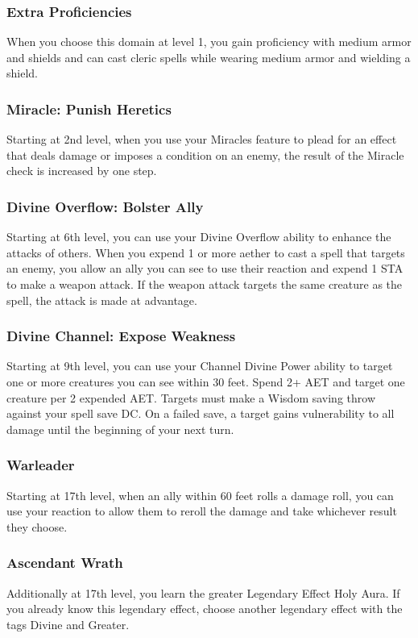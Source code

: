 \subsubsection{Extra Proficiencies}
When you choose this domain at level 1, you gain proficiency with medium armor and shields and can cast cleric spells while wearing medium armor and wielding a shield.

\subsubsection{Miracle: Punish Heretics}
Starting at 2nd level, when you use your Miracles feature to plead for an effect that deals damage or imposes a condition on an enemy, the result of the Miracle check is increased by one step.

\subsubsection{Divine Overflow: Bolster Ally}
Starting at 6th level, you can use your Divine Overflow ability to enhance the attacks of others. When you expend 1 or more aether to cast a spell that targets an enemy, you allow an ally you can see to use their reaction and expend 1 STA to make a weapon attack. If the weapon attack targets the same creature as the spell, the attack is made at advantage.

\subsubsection{Divine Channel: Expose Weakness}
Starting at 9th level, you can use your Channel Divine Power ability to target one or more creatures you can see within 30 feet. Spend 2+ AET and target one creature per 2 expended AET. Targets must make a Wisdom saving throw against your spell save DC. On a failed save, a target gains vulnerability to all damage until the beginning of your next turn.

\subsubsection{Warleader}
Starting at 17th level, when an ally within 60 feet rolls a damage roll, you can use your reaction to allow them to reroll the damage and take whichever result they choose.

\subsubsection{Ascendant Wrath}
Additionally at 17th level, you learn the greater Legendary Effect Holy Aura. If you already know this legendary effect, choose another legendary effect with the tags Divine and Greater.

